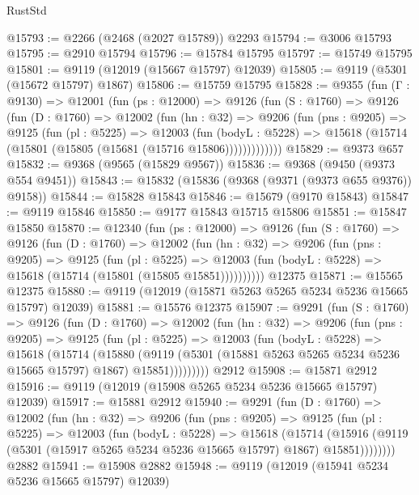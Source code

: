 \begin{lexlean}{RustStd}
\begin{coremodule}
@15793 := @2266 (@2468 (@2027 @15789)) @2293
@15794 := @3006 @15793
@15795 := @2910 @15794
@15796 := @15784 @15795
@15797 := @15749 @15795
@15801 := @9119 (@12019 (@15667 @15797) @12039)
@15805 := @9119 (@5301 (@15672 @15797) @1867)
@15806 := @15759 @15795
@15828 := @9355
    (fun (Γ : @9130) =>
    @12001
      (fun (ps : @12000) =>
      @9126
        (fun (S : @1760) =>
        @9126
          (fun (D : @1760) =>
          @12002
            (fun (hn : @32) =>
            @9206
              (fun (pns : @9205) =>
              @9125
                (fun (pl : @5225) =>
                @12003
                  (fun (bodyL : @5228) =>
                  @15618 (@15714 (@15801 (@15805 (@15681 (@15716 @15806)))))))))))))
@15829 := @9373 @657
@15832 := @9368 (@9565 (@15829 @9567))
@15836 := @9368 (@9450 (@9373 @554 @9451))
@15843 := @15832 (@15836 (@9368 (@9371 (@9373 @655 @9376)) @9158))
@15844 := @15828 @15843
@15846 := @15679 (@9170 @15843)
@15847 := @9119 @15846
@15850 := @9177 @15843 @15715 @15806
@15851 := @15847 @15850
@15870 := @12340
    (fun (ps : @12000) =>
    @9126
      (fun (S : @1760) =>
      @9126
        (fun (D : @1760) =>
        @12002
          (fun (hn : @32) =>
          @9206
            (fun (pns : @9205) =>
            @9125
              (fun (pl : @5225) =>
              @12003 (fun (bodyL : @5228) => @15618 (@15714 (@15801 (@15805 @15851))))))))))
    @12375
@15871 := @15565 @12375
@15880 := @9119 (@12019 (@15871 @5263 @5265 @5234 @5236 @15665 @15797) @12039)
@15881 := @15576 @12375
@15907 := @9291
    (fun (S : @1760) =>
    @9126
      (fun (D : @1760) =>
      @12002
        (fun (hn : @32) =>
        @9206
          (fun (pns : @9205) =>
          @9125
            (fun (pl : @5225) =>
            @12003
              (fun (bodyL : @5228) =>
              @15618
                (@15714
                  (@15880
                    (@9119
                      (@5301 (@15881 @5263 @5265 @5234 @5236 @15665 @15797) @1867)
                      @15851)))))))))
    @2912
@15908 := @15871 @2912
@15916 := @9119 (@12019 (@15908 @5265 @5234 @5236 @15665 @15797) @12039)
@15917 := @15881 @2912
@15940 := @9291
    (fun (D : @1760) =>
    @12002
      (fun (hn : @32) =>
      @9206
        (fun (pns : @9205) =>
        @9125
          (fun (pl : @5225) =>
          @12003
            (fun (bodyL : @5228) =>
            @15618
              (@15714
                (@15916 (@9119 (@5301 (@15917 @5265 @5234 @5236 @15665 @15797) @1867) @15851))))))))
    @2882
@15941 := @15908 @2882
@15948 := @9119 (@12019 (@15941 @5234 @5236 @15665 @15797) @12039)

\end{coremodule}
\end{lexlean}
